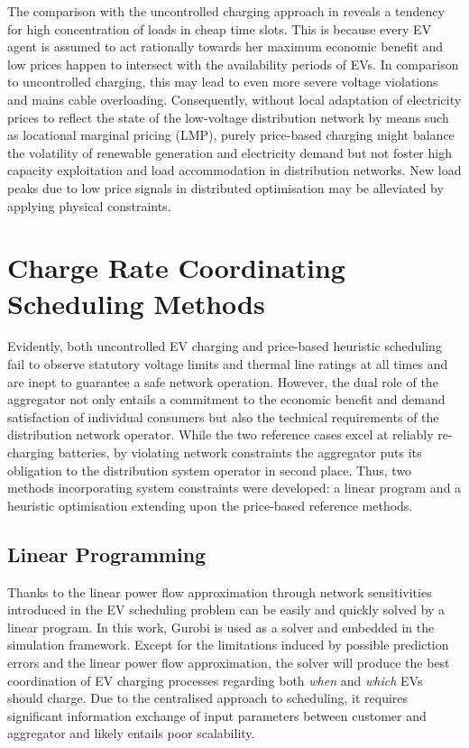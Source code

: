 The comparison with the uncontrolled charging approach in  reveals a tendency for high concentration of loads in cheap time slots. This is because every EV agent is assumed to act rationally towards her maximum economic benefit and low prices happen to intersect with the availability periods of EVs. In comparison to uncontrolled charging, this may lead to even more severe voltage violations and mains cable overloading. Consequently, without local adaptation of electricity prices to reflect the state of the low-voltage distribution network by means such as locational marginal pricing (LMP), purely price-based charging might balance the volatility of renewable generation and electricity demand but not foster high capacity exploitation and load accommodation in distribution networks. New load peaks due to low price signals in distributed optimisation may be alleviated by applying physical constraints.

\section{Charge Rate Coordinating Scheduling Methods}
\label{sec:chargecoordination}


Evidently, both uncontrolled EV charging and price-based heuristic scheduling fail to observe statutory voltage limits and thermal line ratings at all times and are inept to guarantee a safe network operation. However, the dual role of the aggregator not only entails a commitment to the economic benefit and demand satisfaction of individual consumers but also the technical requirements of the distribution network operator. While the two reference cases excel at reliably re-charging batteries, by violating network constraints the aggregator puts its obligation to the distribution system operator in second place. Thus, two methods incorporating system constraints were developed: a linear program and a heuristic optimisation extending upon the price-based reference methods. 

\subsection{Linear Programming}

Thanks to the linear power flow approximation through network sensitivities introduced in  the EV scheduling problem can be easily and quickly solved by a linear program. In this work, Gurobi is used as a solver and embedded in the simulation framework. Except for the limitations induced by possible prediction errors and the linear power flow approximation, the solver will produce the best coordination of EV charging processes regarding both \textit{when} and \textit{which} EVs should charge. Due to the centralised approach to scheduling, it requires significant information exchange of input parameters between customer and aggregator and likely entails poor scalability.

